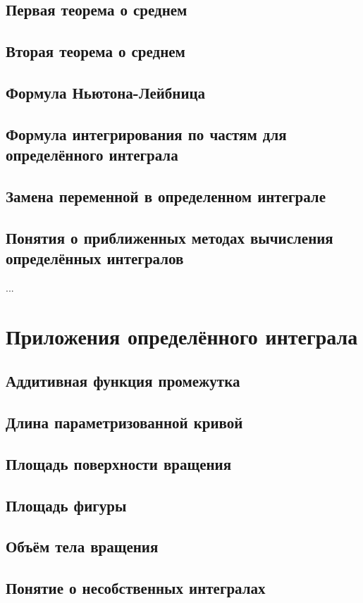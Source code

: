 \subsection{Первая теорема о среднем}
\subsection{Вторая теорема о среднем} 
\subsection{Формула Ньютона-Лейбница}
\subsection{Формула интегрирования по частям для определённого интеграла}
\subsection{Замена переменной в определенном интеграле}
\subsection{Понятия о приближенных методах вычисления определённых интегралов}
...

\section{Приложения определённого интеграла}
\subsection{Аддитивная функция промежутка}

\subsection{Длина параметризованной кривой} 
\subsection{Площадь поверхности вращения}
\subsection{Площадь фигуры}
\subsection{Объём тела вращения}
\subsection{Понятие о несобственных интегралах}


